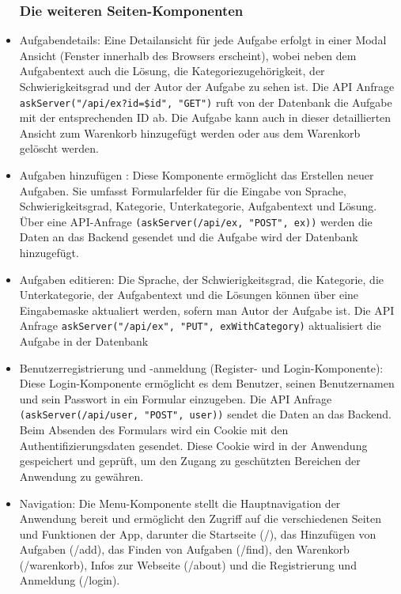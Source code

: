 \begin{itemize}
\subsubsection{Die weiteren Seiten-Komponenten}
\item Aufgabendetails:
Eine Detailansicht für jede Aufgabe erfolgt in einer Modal Ansicht (Fenster innerhalb des Browsers erscheint), wobei neben dem Aufgabentext auch die Lösung, die Kategoriezugehörigkeit, der Schwierigkeitsgrad und der Autor der Aufgabe zu sehen ist. 
Die API Anfrage \texttt{askServer("/api/ex?id=\${id}", "GET")} ruft von der Datenbank die Aufgabe mit der entsprechenden ID ab.
Die Aufgabe kann auch in dieser detaillierten Ansicht zum Warenkorb hinzugefügt werden oder aus dem Warenkorb gelöscht werden.


\item Aufgaben hinzufügen :
Diese Komponente ermöglicht das Erstellen neuer Aufgaben. Sie umfasst Formularfelder für die Eingabe von Sprache, Schwierigkeitsgrad, Kategorie, Unterkategorie, Aufgabentext und Lösung. Über eine API-Anfrage \texttt{(askServer(/api/ex, "POST", ex))} werden die Daten an das Backend gesendet und die Aufgabe wird der Datenbank hinzugefügt.


\item Aufgaben editieren:
Die Sprache, der Schwierigkeitsgrad, die Kategorie, die Unterkategorie, der Aufgabentext und die Lösungen können über eine Eingabemaske aktualiert werden, sofern man Autor der Aufgabe ist.
Die API Anfrage \texttt{askServer("/api/ex", "PUT", exWithCategory)} aktualisiert die Aufgabe in der Datenbank


 
\item Benutzerregistrierung und -anmeldung (Register- und Login-Komponente):
Diese Login-Komponente ermöglicht es dem Benutzer, seinen Benutzernamen und sein Passwort in ein Formular einzugeben. Die API Anfrage \texttt{(askServer(/api/user, "POST", user))} sendet die Daten an das Backend.
Beim Absenden des Formulars wird ein Cookie mit den Authentifizierungsdaten gesendet. Diese Cookie wird in der Anwendung gespeichert und geprüft, um den Zugang zu geschützten Bereichen der Anwendung zu gewähren.

\item Navigation:
Die Menu-Komponente stellt die Hauptnavigation der Anwendung bereit und ermöglicht den Zugriff auf die verschiedenen Seiten und Funktionen der App, darunter die Startseite (/), das Hinzufügen von Aufgaben (/add), das Finden von Aufgaben (/find), den Warenkorb (/warenkorb), Infos zur Webseite (/about) und die Registrierung und Anmeldung (/login).


\end{itemize}


